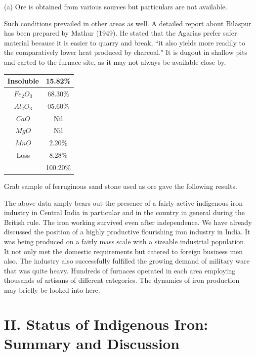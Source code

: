 (a) Ore is obtained from various sources but particulars are not available.

Such conditions prevailed in other areas as well.  A detailed report about Bilaspur has been prepared by Mathur (1949). He stated that the Agarias prefer safer material because it is easier to quarry and break, ``it also yields more readily to the comparatively lower heat produced by charcoal." It is dugout in shallow pits and carted to the furnace site, as it may not always be available close by.

{\fontsize{7}{9}\selectfont
\begin{center}
\begin{tabular}{|c|c|}
\hline
Insoluble & 15.82\%\\\hline
$Fe_2O_3$ & 68.30\%\\\hline
$Al_2O_3$ & 05.60\%\\\hline
$CaO$ & Nil\\\hline
$MgO$ & Nil\\\hline
$MnO$ & 2.20\%\\\hline
Loss & 8.28\%\\\hline
&100.20\%\\\hline
\end{tabular}
\end{center}
}
Grab sample of ferruginous sand stone used as ore gave the following results.

The above data amply bears out the presence of a fairly active indigenous iron industry in Central India in particular and in the country in general during the British rule. The iron working survived even after independence. We have already discussed the position of a highly productive flourishing iron industry in India.  It was being produced on a fairly mass scale with a sizeable industrial population. It not only met the domestic requirements but catered to foreign business men also. The industry also successfully fulfilled the growing demand of military ware that was quite heavy.  Hundreds of furnaces operated in each area employing thousands of artisans of different categories.  The dynamics of iron production may briefly be looked into here.

\vspace{-.3cm}

\section*{II. Status of Indigenous Iron:\\ Summary and Discussion}\label{chapter6-section-2}

